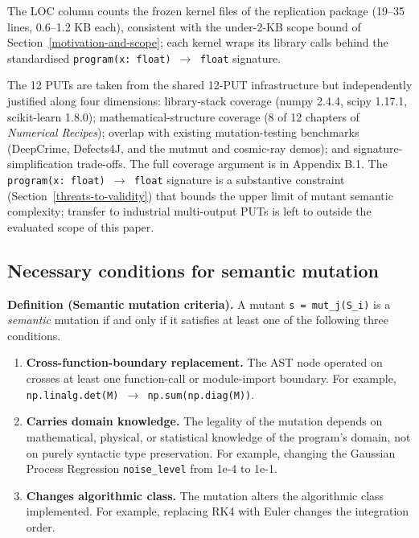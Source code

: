 \documentclass[manuscript,screen,review]{acmart}
\begin{document}
The LOC column counts the frozen kernel files of the replication package
(19--35 lines, 0.6--1.2 KB each), consistent with the under-2-KB scope
bound of Section~\ref{motivation-and-scope}; each kernel wraps its
library calls behind the standardised \texttt{program(x: float)
$\to$ float} signature.

The 12 PUTs are taken from the shared 12-PUT infrastructure \citep{li2026minmrcomplete} but
independently justified along four dimensions: library-stack coverage
(numpy 2.4.4, scipy 1.17.1, scikit-learn 1.8.0); mathematical-structure
coverage (8 of 12 chapters of \emph{Numerical Recipes}); overlap with
existing mutation-testing benchmarks (DeepCrime, Defects4J, and the
mutmut and cosmic-ray demos); and signature-simplification trade-offs.
The full coverage argument is in Appendix B.1. The
\texttt{program(x:\ float)\ $\to$\ float} signature is a substantive
constraint (Section~\ref{threats-to-validity}) that bounds the upper limit of mutant semantic
complexity; transfer to industrial multi-output PUTs is left to
outside the evaluated scope of this paper.

\subsection{Necessary conditions for semantic mutation}\label{necessary-conditions-for-semantic-mutation-layer-1}

\textbf{Definition (Semantic mutation criteria).} A mutant
\texttt{s\textquotesingle{}\ =\ mut\_j(S\_i)} is a \emph{semantic}
mutation if and only if it satisfies at least one of the following three
conditions.

\begin{enumerate}
\item
  \textbf{Cross-function-boundary replacement.} The AST node operated on
  crosses at least one function-call or module-import boundary. For
  example, \texttt{np.linalg.det(M)\ $\to$\ np.sum(np.diag(M))}.
\item
  \textbf{Carries domain knowledge.} The legality of the mutation
  depends on mathematical, physical, or statistical knowledge of the
  program's domain, not on purely syntactic type preservation. For
  example, changing the Gaussian Process Regression
  \texttt{noise\_level} from 1e-4 to 1e-1.
\item
  \textbf{Changes algorithmic class.} The mutation alters the
  algorithmic class implemented. For example, replacing RK4 with Euler
  changes the integration order.
\end{enumerate}
\end{document}
